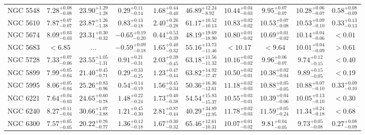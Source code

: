 \documentclass[onecolumn]{mn2e}
\begin{document}
\begin{landscape}
{\begin{center}
\begin{longtable}{lccccccccc}
NGC 5548 & $7.28_{-0.08}^{+0.08}$ & $23.90_{-1.28}^{+1.29}$ & $0.29_{-0.14}^{+0.11}$ & $1.68_{-0.40}^{+0.44}$ &$46.89_{-8.92}^{+12.24}$ & $10.44_{-0.03}^{+0.04}$ & $9.95_{-0.07}^{+0.07}$ & $10.28_{-0.07}^{+0.06}$ & $0.58_{-0.09}^{+0.08}$ \\
NGC 5610 & $7.87_{-0.07}^{+0.07}$ & $23.87_{-1.38}^{+1.26}$ & $0.83_{-0.18}^{+0.13}$ & $2.40_{-0.28}^{+0.26}$ &$61.17_{-10.13}^{+10.52}$ & $10.83_{-0.02}^{+0.02}$ & $10.53_{-0.08}^{+0.07}$ & $10.53_{-0.10}^{+0.09}$ & $0.33_{-0.13}^{+0.13}$ \\
NGC 5674 & $8.09_{-0.03}^{+0.03}$ & $23.31_{-0.32}^{+0.30}$ & $-0.65_{-0.20}^{+0.19}$ & $0.44_{-0.39}^{+0.53}$ &$48.19_{-18.90}^{+19.69}$ & $10.80_{-0.02}^{+0.01}$ & $10.69_{-0.02}^{+0.01}$ & $10.14_{-0.06}^{+0.04}$ & $<0.01$ \\
NGC 5683 & $<6.85$ & ... & $-0.59_{-0.18}^{+0.09}$ & $1.65_{-0.32}^{+0.40}$ &$55.16_{-11.46}^{+13.73}$ & $<10.17$ & $<9.64$ & $10.01_{-0.09}^{+0.04}$ & $>0.61$ \\
NGC 5728 & $7.33_{-0.06}^{+0.07}$ & $23.55_{-1.31}^{+1.05}$ & $0.91_{-0.31}^{+0.21}$ & $2.03_{-0.45}^{+0.39}$ &$63.18_{-11.32}^{+11.56}$ & $10.16_{-0.02}^{+0.02}$ & $9.96_{-0.07}^{+0.06}$ & $9.74_{-0.15}^{+0.12}$ & $<0.40$ \\
NGC 5899 & $7.99_{-0.04}^{+0.05}$ & $21.40_{-0.71}^{+0.45}$ & $0.29_{-0.25}^{+0.33}$ & $1.23_{-0.44}^{+0.47}$ &$63.82_{-17.47}^{+14.92}$ & $10.50_{-0.01}^{+0.02}$ & $10.38_{-0.04}^{+0.02}$ & $9.89_{-0.05}^{+0.15}$ & $<0.19$ \\
NGC 5995 & $8.06_{-0.04}^{+0.05}$ & $25.26_{-0.96}^{+0.83}$ & $0.54_{-0.19}^{+0.14}$ & $1.56_{-0.34}^{+0.45}$ &$50.36_{-12.61}^{+16.36}$ & $11.18_{-0.03}^{+0.02}$ & $10.88_{-0.05}^{+0.05}$ & $10.88_{-0.10}^{+0.07}$ & $0.33_{-0.10}^{+0.09}$ \\
NGC 6221 & $7.64_{-0.03}^{+0.04}$ & $24.65_{-0.78}^{+0.60}$ & $1.48_{-0.24}^{+0.22}$ & $1.73_{-0.38}^{+0.40}$ &$54.54_{-15.37}^{+15.83}$ & $10.55_{-0.01}^{+0.03}$ & $10.39_{-0.06}^{+0.04}$ & $10.05_{-0.10}^{+0.13}$ & $<0.30$ \\
NGC 6240 & $8.27_{-0.04}^{+0.11}$ & $30.66_{-3.88}^{+1.07}$ & $1.21_{-0.30}^{+0.45}$ & $2.81_{-0.44}^{+0.87}$ &$40.29_{-12.95}^{+34.89}$ & $11.78_{-0.03}^{+0.02}$ & $11.59_{-0.24}^{+0.05}$ & $11.34_{-0.18}^{+0.24}$ & $<0.68$ \\
NGC 6300 & $7.57_{-0.05}^{+0.05}$ & $20.22_{-0.77}^{+0.76}$ & $1.36_{-0.18}^{+0.12}$ & $1.67_{-0.32}^{+0.30}$ &$65.46_{-10.31}^{+12.61}$ & $10.07_{-0.02}^{+0.01}$ & $9.81_{-0.05}^{+0.04}$ & $9.73_{-0.08}^{+0.05}$ & $0.27_{-0.09}^{+0.08}$ \\

\end{longtable}
\end{center}}
\end{landscape}
\end{document}
